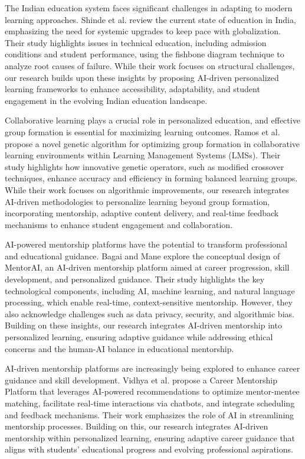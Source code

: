 The Indian education system faces significant challenges in adapting to modern learning approaches. Shinde et al. \cite{ref5} review the current state of education in India, emphasizing the need for systemic upgrades to keep pace with globalization. Their study highlights issues in technical education, including admission conditions and student performance, using the fishbone diagram technique to analyze root causes of failure. While their work focuses on structural challenges, our research builds upon these insights by proposing AI-driven personalized learning frameworks to enhance accessibility, adaptability, and student engagement in the evolving Indian education landscape.


Collaborative learning plays a crucial role in personalized education, and effective group formation is essential for maximizing learning outcomes. Ramos et al. \cite{ref6} propose a novel genetic algorithm for optimizing group formation in collaborative learning environments within Learning Management Systems (LMSs). Their study highlights how innovative genetic operators, such as modified crossover techniques, enhance accuracy and efficiency in forming balanced learning groups. While their work focuses on algorithmic improvements, our research integrates AI-driven methodologies to personalize learning beyond group formation, incorporating mentorship, adaptive content delivery, and real-time feedback mechanisms to enhance student engagement and collaboration.


AI-powered mentorship platforms have the potential to transform professional and educational guidance. Bagai and Mane \cite{ref7} explore the conceptual design of MentorAI, an AI-driven mentorship platform aimed at career progression, skill development, and personalized guidance. Their study highlights the key technological components, including AI, machine learning, and natural language processing, which enable real-time, context-sensitive mentorship. However, they also acknowledge challenges such as data privacy, security, and algorithmic bias. Building on these insights, our research integrates AI-driven mentorship into personalized learning, ensuring adaptive guidance while addressing ethical concerns and the human-AI balance in educational mentorship.

AI-driven mentorship platforms are increasingly being explored to enhance career guidance and skill development. Vidhya et al. \cite{ref8} propose a Career Mentorship Platform that leverages AI-powered recommendations to optimize mentor-mentee matching, facilitate real-time interactions via chatbots, and integrate scheduling and feedback mechanisms. Their work emphasizes the role of AI in streamlining mentorship processes. Building on this, our research integrates AI-driven mentorship within personalized learning, ensuring adaptive career guidance that aligns with students’ educational progress and evolving professional aspirations.

